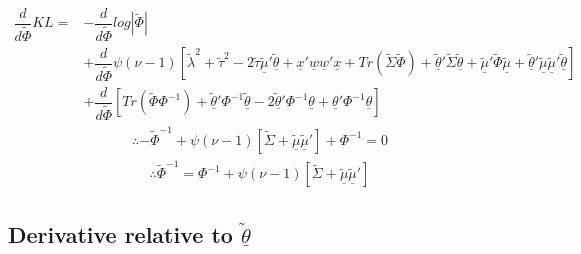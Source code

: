 \documentclass[fleqn]{minimal}
\begin{document}
\begin{align*}
  \dfrac{d}{d\tilde{\Phi}}KL
  = & - \dfrac{d}{d\tilde{\Phi}} log \left| \tilde{\Phi} \right|\\
  & + \dfrac{d}{d\tilde{\Phi}}
  \psi\left(\nu-1\right)
  \left[
    \tilde{\lambda}^2 + \tilde{\tau}^2
    - 2\tilde{\tau}\underline{\tilde{\mu}}'\underline{\tilde{\theta}}
    + \underline{x}'\underline{w}\underline{w}'\underline{x}
    + Tr \left( \tilde{\Sigma}\tilde{\Phi}\right)
    + \underline{\tilde{\theta}}'\tilde{\Sigma}\underline{\tilde{\theta}}
    + \underline{\tilde{\mu}}'\tilde{\Phi}\underline{\tilde{\mu}}
    + \underline{\tilde{\theta}}'\underline{\tilde{\mu}}\underline{\tilde{\mu}}'\underline{\tilde{\theta}}
  \right] \\
  & + \dfrac{d}{d\tilde{\Phi}}
  \left[
    Tr\left(\tilde{\Phi} \Phi^{-1}\right)
    + \underline{\tilde{\theta}}'\Phi^{-1}\underline{\tilde{\theta}}
    -2 \underline{\tilde{\theta}}' \Phi^{-1}\underline{\theta}
    + \underline{\theta}' \Phi^{-1}\underline{\theta}
  \right]
\end{align*}
\begin{align*}
  \therefore
  - \tilde{\Phi}^{-1}
  + \psi\left(\nu-1\right)
  \left[
    \tilde{\Sigma}
    + \underline{\tilde{\mu}}\underline{\tilde{\mu}}'
  \right]
  + \Phi^{-1}
  =0 
\end{align*}
\begin{align*}
  \therefore
  \tilde{\Phi}^{-1}
  =
  \Phi^{-1} 
  + \psi\left(\nu-1\right)
  \left[
    \tilde{\Sigma}
    + \underline{\tilde{\mu}}\underline{\tilde{\mu}}'
  \right]
\end{align*}

\subsection{Derivative relative to $\underline{\tilde{\theta}}$}
\end{document}
